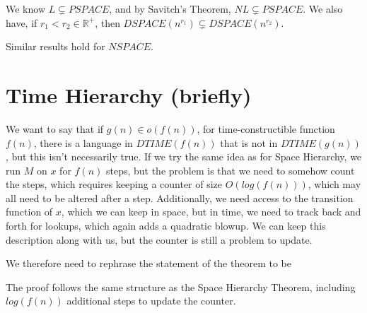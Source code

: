 We know $L\subsetneq PSPACE$, and by Savitch's Theorem, $NL\subsetneq PSPACE$.  We also have, if $r_1<r_2\in \mathbb{R}^+$, then $DSPACE(n^{r_1}) \subsetneq DSPACE(n^{r_2})$.

Similar results hold for $NSPACE$.

\section*{Time Hierarchy (briefly)}

We want to say that if $g(n)\in o(f(n))$, for time-constructible function $f(n)$, there is a language in $DTIME(f(n))$ that is not in $DTIME(g(n))$, but this isn't necessarily true.  If we try the same idea as for Space Hierarchy, we run $M$ on $x$ for $f(n)$ steps, but the problem is that we need to somehow count the steps, which requires keeping a counter of size $O(log(f(n)))$, which may all need to be altered after a step.  Additionally, we need access to the transition function of $x$, which we can keep in space, but in time, we need to track back and forth for lookups, which again adds a quadratic blowup.  We can keep this description along with us, but the counter is still a problem to update.  

We therefore need to rephrase the statement of the theorem to be


The proof follows the same structure as the Space Hierarchy Theorem, including $log(f(n))$ additional steps to update the counter.



